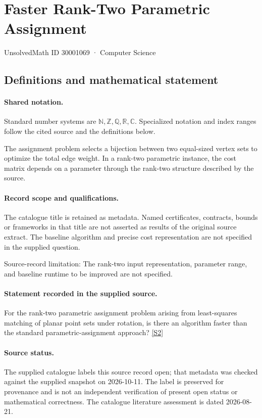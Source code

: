 \documentclass[11pt]{article}
\newcommand{\sref}[2]{\hyperlink{source:#1:#2}{[S#2]}}
\begin{document}
\setcounter{section}{30001068}
\section{Faster Rank-Two Parametric Assignment}\label{30001069}
{\small\sffamily UnsolvedMath ID 30001069 · Computer Science}
\subsection{Definitions and mathematical statement}

\paragraph{Shared notation.}Standard number systems are $\mathbb N,\mathbb Z,\mathbb Q,\mathbb R,\mathbb C$. Specialized notation and index ranges follow the cited source and the definitions below.


The assignment problem selects a bijection between two equal-sized vertex sets to optimize the total edge weight. In a rank-two parametric instance, the cost matrix depends on a parameter through the rank-two structure described by the source.
\paragraph{Record scope and qualifications.}
The catalogue title is retained as metadata. Named certificates, contracts, bounds or frameworks in that title are not asserted as results of the original source extract.
The baseline algorithm and precise cost representation are not specified in the supplied question.

Source-record limitation: The rank-two input representation, parameter range, and baseline runtime to be improved are not specified.
\paragraph{Statement recorded in the supplied source.}
For the rank-two parametric assignment problem arising from least-squares matching of planar point sets under rotation, is there an algorithm faster than the standard parametric-assignment approach? \sref{30001069}{2}
\paragraph{Source status.}
The supplied catalogue labels this source record open; that metadata was checked against the supplied snapshot on 2026-10-11. The label is preserved for provenance and is not an independent verification of present open status or mathematical correctness. The catalogue literature assessment is dated 2026-08-21.
\end{document}

